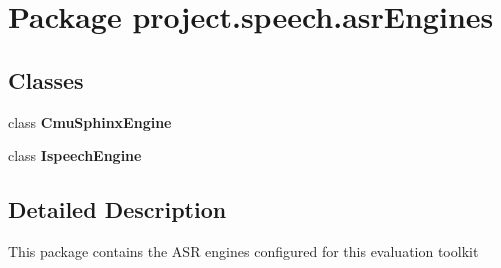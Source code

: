 \section{Package project.\+speech.\+asr\+Engines}
\label{namespaceproject_1_1speech_1_1asr_engines}
\subsection*{Classes}
\begin{DoxyCompactItemize}
\item 
class {\bf Cmu\+Sphinx\+Engine}
\item 
class {\bf Ispeech\+Engine}
\end{DoxyCompactItemize}


\subsection{Detailed Description}
This package contains the A\+S\+R engines configured for this evaluation toolkit 